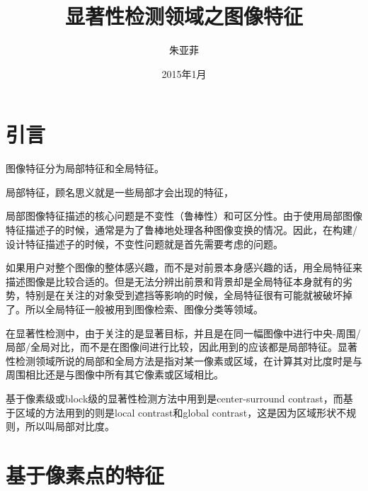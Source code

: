 \documentclass[12pt]{article}
\begin{document}
\title{\vspace{-2em}显著性检测领域之图像特征\vspace{-0.7em}}
\author{朱亚菲}
\date{\vspace{-0.7em}2015年1月\vspace{-0.7em}}
\maketitle\thispagestyle{fancy}
\maketitle
\tableofcontents 


\section{引言}

图像特征分为局部特征和全局特征。

局部特征，顾名思义就是一些局部才会出现的特征，

局部图像特征描述的核心问题是不变性（鲁棒性）和可区分性。由于使用局部图像特征描述子的时候，通常是为了鲁棒地处理各种图像变换的情况。因此，在构建/设计特征描述子的时候，不变性问题就是首先需要考虑的问题。

如果用户对整个图像的整体感兴趣，而不是对前景本身感兴趣的话，用全局特征来描述图像是比较合适的。但是无法分辨出前景和背景却是全局特征本身就有的劣势，特别是在关注的对象受到遮挡等影响的时候，全局特征很有可能就被破坏掉了。所以全局特征一般被用到图像检索、图像分类等领域。

在显著性检测中，由于关注的是显著目标，并且是在同一幅图像中进行中央-周围/局部/全局对比，而不是在图像间进行比较，因此用到的应该都是局部特征。显著性检测领域所说的局部和全局方法是指对某一像素或区域，在计算其对比度时是与周围相比还是与图像中所有其它像素或区域相比。

基于像素级或block级的显著性检测方法中用到是center-surround contrast，而基于区域的方法用到的则是local contrast和global contrast，这是因为区域形状不规则，所以叫局部对比度。

\section{基于像素点的特征}
\end{document}
